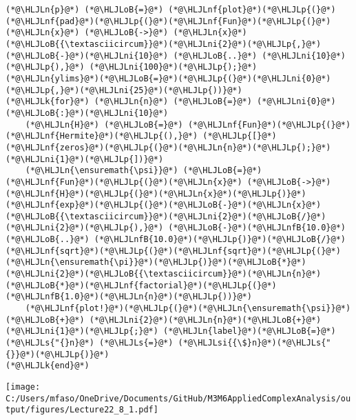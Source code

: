 \documentclass[12pt,landscape]{article}
\newcommand{\HLJLk}[1]{\textcolor[RGB]{148,91,176}{\textbf{#1}}}
\newcommand{\HLJLn}[1]{#1}
\newcommand{\HLJLnf}[1]{\textcolor[RGB]{66,102,213}{#1}}
\newcommand{\HLJLs}[1]{\textcolor[RGB]{201,61,57}{#1}}
\newcommand{\HLJLsi}[1]{#1}
\newcommand{\HLJLnfB}[1]{\textcolor[RGB]{59,151,46}{#1}}
\newcommand{\HLJLni}[1]{\textcolor[RGB]{59,151,46}{#1}}
\newcommand{\HLJLoB}[1]{\textcolor[RGB]{102,102,102}{\textbf{#1}}}
\newcommand{\HLJLp}[1]{#1}
\def\cent#1{\begin{center}#1\end{center} }
\begin{document}
{\begin{lstlisting}
(*@\HLJLn{p}@*) (*@\HLJLoB{=}@*) (*@\HLJLnf{plot}@*)(*@\HLJLp{(}@*)(*@\HLJLnf{pad}@*)(*@\HLJLp{(}@*)(*@\HLJLnf{Fun}@*)(*@\HLJLp{(}@*)(*@\HLJLn{x}@*) (*@\HLJLoB{->}@*) (*@\HLJLn{x}@*)(*@\HLJLoB{{\textasciicircum}}@*)(*@\HLJLni{2}@*)(*@\HLJLp{,}@*) (*@\HLJLoB{-}@*)(*@\HLJLni{10}@*) (*@\HLJLoB{..}@*) (*@\HLJLni{10}@*)(*@\HLJLp{),}@*) (*@\HLJLni{100}@*)(*@\HLJLp{);}@*) (*@\HLJLn{ylims}@*)(*@\HLJLoB{=}@*)(*@\HLJLp{(}@*)(*@\HLJLni{0}@*)(*@\HLJLp{,}@*)(*@\HLJLni{25}@*)(*@\HLJLp{))}@*)
(*@\HLJLk{for}@*) (*@\HLJLn{n}@*) (*@\HLJLoB{=}@*) (*@\HLJLni{0}@*)(*@\HLJLoB{:}@*)(*@\HLJLni{10}@*)
    (*@\HLJLn{H}@*) (*@\HLJLoB{=}@*) (*@\HLJLnf{Fun}@*)(*@\HLJLp{(}@*)(*@\HLJLnf{Hermite}@*)(*@\HLJLp{(),}@*) (*@\HLJLp{[}@*)(*@\HLJLnf{zeros}@*)(*@\HLJLp{(}@*)(*@\HLJLn{n}@*)(*@\HLJLp{);}@*)(*@\HLJLni{1}@*)(*@\HLJLp{])}@*)
    (*@\HLJLn{\ensuremath{\psi}}@*) (*@\HLJLoB{=}@*) (*@\HLJLnf{Fun}@*)(*@\HLJLp{(}@*)(*@\HLJLn{x}@*) (*@\HLJLoB{->}@*) (*@\HLJLnf{H}@*)(*@\HLJLp{(}@*)(*@\HLJLn{x}@*)(*@\HLJLp{)}@*)(*@\HLJLnf{exp}@*)(*@\HLJLp{(}@*)(*@\HLJLoB{-}@*)(*@\HLJLn{x}@*)(*@\HLJLoB{{\textasciicircum}}@*)(*@\HLJLni{2}@*)(*@\HLJLoB{/}@*)(*@\HLJLni{2}@*)(*@\HLJLp{),}@*) (*@\HLJLoB{-}@*)(*@\HLJLnfB{10.0}@*) (*@\HLJLoB{..}@*) (*@\HLJLnfB{10.0}@*)(*@\HLJLp{)}@*)(*@\HLJLoB{/}@*)(*@\HLJLnf{sqrt}@*)(*@\HLJLp{(}@*)(*@\HLJLnf{sqrt}@*)(*@\HLJLp{(}@*)(*@\HLJLn{\ensuremath{\pi}}@*)(*@\HLJLp{)}@*)(*@\HLJLoB{*}@*)(*@\HLJLni{2}@*)(*@\HLJLoB{{\textasciicircum}}@*)(*@\HLJLn{n}@*)(*@\HLJLoB{*}@*)(*@\HLJLnf{factorial}@*)(*@\HLJLp{(}@*)(*@\HLJLnfB{1.0}@*)(*@\HLJLn{n}@*)(*@\HLJLp{))}@*)
    (*@\HLJLnf{plot!}@*)(*@\HLJLp{(}@*)(*@\HLJLn{\ensuremath{\psi}}@*) (*@\HLJLoB{+}@*) (*@\HLJLni{2}@*)(*@\HLJLn{n}@*)(*@\HLJLoB{+}@*)(*@\HLJLni{1}@*)(*@\HLJLp{;}@*) (*@\HLJLn{label}@*)(*@\HLJLoB{=}@*)(*@\HLJLs{"{}n}@*) (*@\HLJLs{=}@*) (*@\HLJLsi{{\$}n}@*)(*@\HLJLs{"{}}@*)(*@\HLJLp{)}@*)
(*@\HLJLk{end}@*)
\end{lstlisting}

\cent{\texttt{[image: C:/Users/mfaso/OneDrive/Documents/GitHub/M3M6AppliedComplexAnalysis/output/figures/Lecture22\_8\_1.pdf]}}

}
\end{document}
